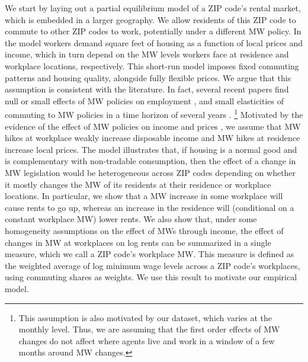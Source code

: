 We start by laying out a partial equilibrium model of a ZIP code's rental market,
which is embedded in a larger geography.
We allow residents of this ZIP code to commute to other ZIP codes to work, 
potentially under a different MW policy.
In the model workers demand square feet of housing as a function of local prices 
and income, which in turn depend on the MW levels workers face at residence and 
workplace locations, respectively.
This short-run model imposes fixed commuting patterns and housing quality, 
alongside fully flexible prices.
We argue that this assumption is consistent with the literature.
In fact, several recent papers find null or small effects of MW policies on 
employment \parencite{CegnizEtAl2019, DustmannEtAl2022}, and 
small elasticities of commuting to MW policies in a time horizon of several 
years \parencite{PerezPerez2021}.%
\footnote{This assumption is also motivated by our dataset, which varies at the 
monthly level. Thus, we are assuming that the first order effects of 
MW changes do not affect where agents live and work in a window of a few months
around MW changes.}
Motivated by the evidence of the effect of MW policies on 
income \parencite{Dube2019Income, CegnizEtAl2019} and 
prices \parencite{AllegrettoReich2018, Leung2021},
we assume that MW hikes at workplace weakly increase disposable income and MW 
hikes at residence increase local prices.
The model illustrates that, if housing is a normal good and is complementary 
with non-tradable consumption, then the effect of a change in MW legislation 
would be heterogeneous across ZIP codes depending on whether it mostly changes 
the MW of its residents at their residence or workplace locations.
In particular, we show that a MW increase in some workplace will cause rents to 
go up, whereas an increase in the residence will (conditional on a constant 
workplace MW) lower rents.
We also show that, under some homogeneity assumptions on the effect of MWs 
through income, the effect of changes in MW at workplaces on log rents can be 
summarized in a single measure, which we call a ZIP code's workplace MW.
This measure is defined as the weighted average of log minimum wage levels 
across a ZIP code's workplaces, using commuting shares as weights.
We use this result to motivate our empirical model.


